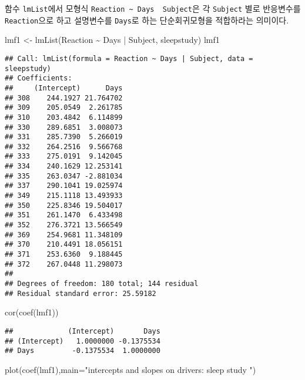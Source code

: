 \documentclass[
]{book}
\newenvironment{Shaded}{\begin{snugshade}}{\end{snugshade}}
\newcommand{\AttributeTok}[1]{\textcolor[rgb]{0.77,0.63,0.00}{#1}}
\newcommand{\FunctionTok}[1]{\textcolor[rgb]{0.00,0.00,0.00}{#1}}
\newcommand{\NormalTok}[1]{#1}
\newcommand{\OtherTok}[1]{\textcolor[rgb]{0.56,0.35,0.01}{#1}}
\newcommand{\SpecialCharTok}[1]{\textcolor[rgb]{0.00,0.00,0.00}{#1}}
\newcommand{\StringTok}[1]{\textcolor[rgb]{0.31,0.60,0.02}{#1}}
\begin{document}
함수 \texttt{lmList}에서 모형식 \texttt{Reaction\ \textasciitilde{}\ Days\ \textbar{}\ Subject}은 각 \texttt{Subject} 별로 반응변수를 \texttt{Reaction}으로 하고 설명변수를 \texttt{Days}로 하는 단순회귀모형을 적합하라는 의미이다.

\begin{Shaded}
\begin{Highlighting}[]
\NormalTok{lmf1 }\OtherTok{\textless{}{-}} \FunctionTok{lmList}\NormalTok{(Reaction }\SpecialCharTok{\textasciitilde{}}\NormalTok{ Days }\SpecialCharTok{|}\NormalTok{ Subject, sleepstudy)}
\NormalTok{lmf1}
\end{Highlighting}
\end{Shaded}

\begin{verbatim}
## Call: lmList(formula = Reaction ~ Days | Subject, data = sleepstudy) 
## Coefficients:
##     (Intercept)      Days
## 308    244.1927 21.764702
## 309    205.0549  2.261785
## 310    203.4842  6.114899
## 330    289.6851  3.008073
## 331    285.7390  5.266019
## 332    264.2516  9.566768
## 333    275.0191  9.142045
## 334    240.1629 12.253141
## 335    263.0347 -2.881034
## 337    290.1041 19.025974
## 349    215.1118 13.493933
## 350    225.8346 19.504017
## 351    261.1470  6.433498
## 352    276.3721 13.566549
## 369    254.9681 11.348109
## 370    210.4491 18.056151
## 371    253.6360  9.188445
## 372    267.0448 11.298073
## 
## Degrees of freedom: 180 total; 144 residual
## Residual standard error: 25.59182
\end{verbatim}

\begin{Shaded}
\begin{Highlighting}[]
\FunctionTok{cor}\NormalTok{(}\FunctionTok{coef}\NormalTok{(lmf1))}
\end{Highlighting}
\end{Shaded}

\begin{verbatim}
##             (Intercept)       Days
## (Intercept)   1.0000000 -0.1375534
## Days         -0.1375534  1.0000000
\end{verbatim}

\begin{Shaded}
\begin{Highlighting}[]
\FunctionTok{plot}\NormalTok{(}\FunctionTok{coef}\NormalTok{(lmf1),}\AttributeTok{main=}\StringTok{"intercepts and slopes on drivers: sleep study "}\NormalTok{)}
\end{Highlighting}
\end{Shaded}
\end{document}
